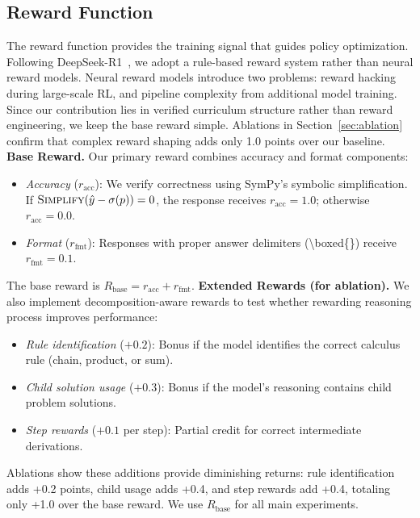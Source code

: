 \documentclass[a4paper,fleqn]{cas-dc}
\theoremstyle{definition}
\begin{document}
\subsection{Reward Function}
\label{sec:reward}
The reward function provides the training signal that guides policy optimization. Following DeepSeek-R1~\cite{deepseek-r1}, we adopt a rule-based reward system rather than neural reward models. Neural reward models introduce two problems: reward hacking during large-scale RL, and pipeline complexity from additional model training. Since our contribution lies in verified curriculum structure rather than reward engineering, we keep the base reward simple. Ablations in Section~\ref{sec:ablation} confirm that complex reward shaping adds only 1.0 points over our baseline.
\noindent
\textbf{Base Reward.} Our primary reward combines accuracy and format components:
\begin{itemize}[leftmargin=1.5em, itemsep=0.2em, topsep=0.3em]
    \item \textit{Accuracy} ($r_{\text{acc}}$): We verify correctness using SymPy's symbolic simplification. If $\textsc{Simplify}(\hat{y} - \sigma(p)) = 0$, the response receives $r_{\text{acc}} = 1.0$; otherwise $r_{\text{acc}} = 0.0$.
    \item \textit{Format} ($r_{\text{fmt}}$): Responses with proper answer delimiters (\textbackslash boxed\{\}) receive $r_{\text{fmt}} = 0.1$.
\end{itemize}
The base reward is $R_{\text{base}} = r_{\text{acc}} + r_{\text{fmt}}$.
\noindent
\textbf{Extended Rewards (for ablation).} We also implement decomposition-aware rewards to test whether rewarding reasoning process improves performance:
\begin{itemize}[leftmargin=1.5em, itemsep=0.2em, topsep=0.3em]
    \item \textit{Rule identification} ($+0.2$): Bonus if the model identifies the correct calculus rule (chain, product, or sum).
    \item \textit{Child solution usage} ($+0.3$): Bonus if the model's reasoning contains child problem solutions.
    \item \textit{Step rewards} ($+0.1$ per step): Partial credit for correct intermediate derivations.
\end{itemize}
Ablations show these additions provide diminishing returns: rule identification adds +0.2 points, child usage adds +0.4, and step rewards add +0.4, totaling only +1.0 over the base reward. We use $R_{\text{base}}$ for all main experiments.
\end{document}
